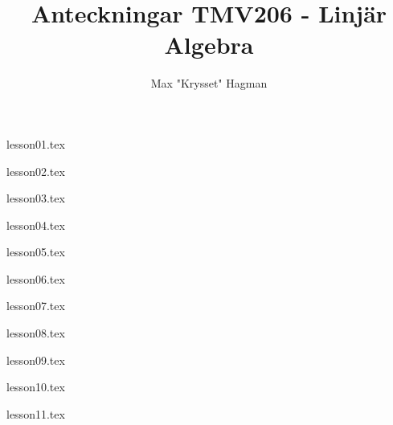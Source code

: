 \documentclass[a4paper]{report}
\title{Anteckningar TMV206 - Linjär Algebra}
\author{Max "Krysset" Hagman}
\begin{document}
    \newcommand{\prim}[1]{#1^{\prime}}

    \maketitle
    \tableofcontents


    {lesson01.tex}

    {lesson02.tex}

    {lesson03.tex}

    {lesson04.tex}

    {lesson05.tex}

    {lesson06.tex}

    {lesson07.tex}

    {lesson08.tex}

    {lesson09.tex}

    {lesson10.tex}

    {lesson11.tex}
\end{document}
